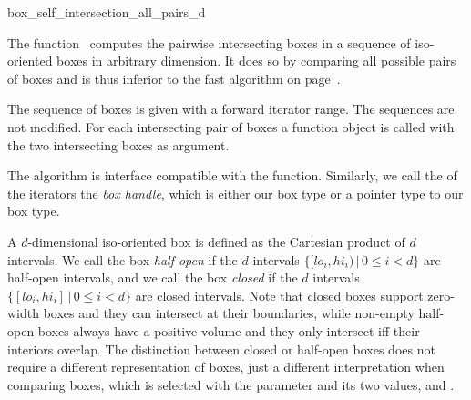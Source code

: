 

\begin{ccRefFunction}{box_self_intersection_all_pairs_d}

\ccDefinition
  
The function \ccRefName\ computes the pairwise intersecting boxes
in a sequence of iso-oriented boxes in arbitrary dimension.
It does so by comparing all possible pairs of boxes and is thus
inferior to the fast  algorithm on 
page~\pageref{ccRef_CGAL::box_self_intersection_d}.

The sequence of boxes is given with a forward iterator range. The
sequences are not modified. For each intersecting pair of boxes a
 function object is called with the two intersecting
boxes as argument.

The algorithm is interface compatible with the
 function. Similarly, we call the
 of the iterators the \emph{box handle}, which is
either our box type or a pointer type to our box type.

A $d$-dimensional iso-oriented box is defined as the Cartesian product
of $d$ intervals. We call the box \emph{half-open} if the $d$
intervals $\{ [lo_i,hi_i) \,|\, 0 \leq i < d\}$ are half-open intervals,
and we call the box \emph{closed} if the $d$ intervals $\{ [lo_i,hi_i]
\,|\, 0 \leq i < d\}$ are closed intervals. Note that closed boxes support
zero-width boxes and they can intersect at their boundaries, while
non-empty half-open boxes always have a positive volume and they only
intersect iff their interiors overlap.  The distinction between closed
or half-open boxes does not require a different representation of
boxes, just a different interpretation when comparing boxes, which is
selected with the  parameter and its two values,
 and
.


\end{ccRefFunction}
